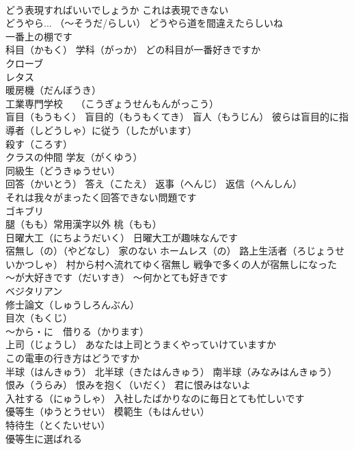 \documentclass[8pt]{extreport}
\begin{document}
\begin{CJK}{UTF8}{min}
\\	どう表現すればいいでしょうか これは表現できない
\\	どうやら... （～そうだ/らしい） どうやら道を間違えたらしいね
\\	一番上の棚です
\\	科目（かもく） 学科（がっか） どの科目が一番好きですか
\\	クローブ
\\	レタス
\\	暖房機（だんぼうき）
\\	工業専門学校　 （こうぎょうせんもんがっこう）
\\	盲目（もうもく） 盲目的（もうもくてき） 盲人（もうじん） 彼らは盲目的に指導者（しどうしゃ）に従う（したがいます）
\\	殺す（ころす）
\\	クラスの仲間 学友（がくゆう）
\\	同級生（どうきゅうせい）
\\	回答（かいとう） 答え（こたえ） 返事（へんじ） 返信（へんしん）
\\	それは我々がまったく回答できない問題です
\\	ゴキブリ
\\	腿（もも）常用漢字以外 桃（もも）
\\	日曜大工（にちようだいく） 日曜大工が趣味なんです
\\	宿無し（の）（やどなし） 家のない ホームレス（の） 路上生活者（ろじょうせいかつしゃ） 村から村へ流れてゆく宿無し 戦争で多くの人が宿無しになった
\\	～が大好きです（だいすき） ～何かとても好きです
\\	ベジタリアン
\\	修士論文（しゅうしろんぶん）
\\	目次（もくじ）
\\	～から・に　借りる（かります）
\\	上司（じょうし） あなたは上司とうまくやっていけていますか
\\	この電車の行き方はどうですか
\\	半球（はんきゅう） 北半球（きたはんきゅう） 南半球（みなみはんきゅう）
\\	恨み（うらみ） 恨みを抱く（いだく） 君に恨みはないよ
\\	入社する（にゅうしゃ） 入社したばかりなのに毎日とても忙しいです
\\	優等生（ゆうとうせい） 模範生（もはんせい）
\\	特待生（とくたいせい）
\\	優等生に選ばれる

\end{CJK}
\end{document}
